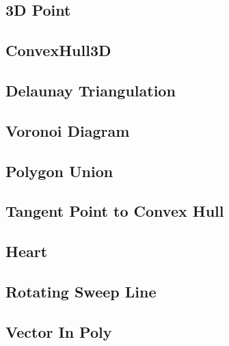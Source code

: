 \documentclass[a4paper,10pt,oneside]{article}
\begin{document}
\subsection{3D Point}


\subsection{ConvexHull3D}


\subsection{Delaunay Triangulation}


\subsection{Voronoi Diagram}


\subsection{Polygon Union}


\subsection{Tangent Point to Convex Hull}


\subsection{Heart}


\subsection{Rotating Sweep Line}


%

\subsection{Vector In Poly}

\end{document}

